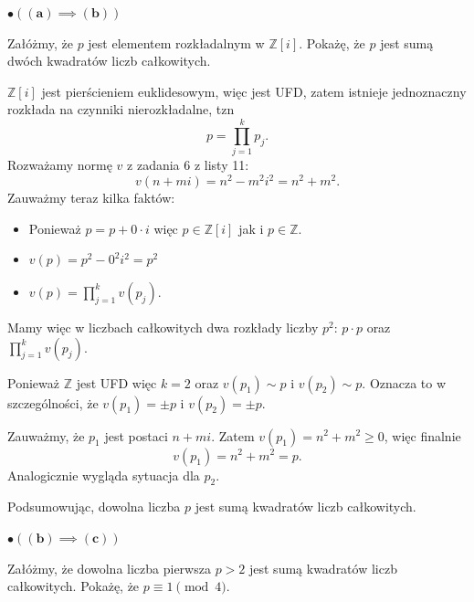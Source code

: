 \begin{solution}
	 \noindent$\bullet \bm{\left(\left(a\right)\implies \left(b\right)\right)}$ 

	 Załóżmy, że $p$ jest elementem rozkładalnym w $\mathbb{Z}\left[ i \right]$. Pokażę, że $p$ jest sumą dwóch kwadratów liczb całkowitych.

	 $\mathbb{Z}\left[ i \right] $ jest pierścieniem euklidesowym, więc jest UFD, zatem istnieje jednoznaczny rozkłada na czynniki  nierozkładalne, tzn
	 \[
	 p = \prod_{j=1}^{k}p_{j}
	 .\] 
	 Rozważamy normę $v$ z zadania 6 z listy 11:
	 \[
	 v\left( n + mi \right) = n^2 - m^2i^2 = n^2 + m^2
	 .\] 
	 Zauważmy teraz kilka faktów:
	 \begin{itemize}
	 	\item Ponieważ $p = p + 0\cdot i$ więc $p \in \mathbb{Z}\left[ i \right]$ jak i $p \in \mathbb{Z}$.
		\item $v\left( p \right) = p^2  - 0^2i^2 = p^2$
		\item $v\left( p \right) = \prod_{j=1}^{k}v\left( p_{j} \right)$.
	 \end{itemize}
	 \noindent Mamy więc w liczbach całkowitych dwa rozkłady liczby $p^2$: $p\cdot p$ oraz $\prod_{j=1}^{k}v\left( p_{j} \right)$.
	 
	 Ponieważ $\mathbb{Z}$ jest UFD więc $k = 2$ oraz $v\left( p_{1} \right) \sim p $ i $v\left( p_{2} \right) \sim p$. Oznacza to w szczególności, że $v\left( p_1 \right) = \pm p$ i $v\left( p_2 \right) = \pm p$.

	 Zauważmy, że $p_1$ jest postaci $n + mi$. Zatem  $v\left( p_1 \right) = n^2 + m^2 \ge 0$, więc finalnie 
	  \[
	 v\left( p_1 \right) = n^2 + m^2 = p
	 .\] 
	 Analogicznie wygląda sytuacja dla $p_2$.

	 Podsumowując, dowolna liczba $p$ jest sumą kwadratów liczb całkowitych.
	 
	 \noindent$\bullet \bm{\left(\left(b\right)\implies \left(c\right)\right)}$ 

	 Załóżmy, że dowolna liczba pierwsza $p > 2$ jest sumą kwadratów liczb całkowitych. Pokażę, że $p \equiv 1 \pmod{4}$.


\end{solution}
